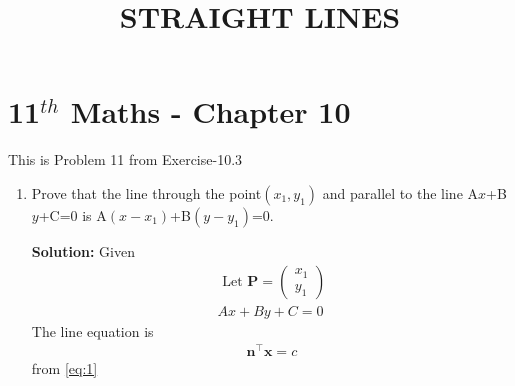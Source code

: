 \documentclass[10pt]{article}
\newcommand{\solution}{\noindent \textbf{Solution: }}
\newcommand{\myvec}[1]{\ensuremath{\begin{pmatrix}#1\end{pmatrix}}}
\let\vec\mathbf{}
\begin{document}
\begin{center}
\title{\textbf{STRAIGHT LINES}}
\date{\vspace{-5ex}} %
\maketitle
\end{center}

\section{11$^{th}$ Maths - Chapter 10}
This is Problem 11 from Exercise-10.3
\begin{enumerate}
\item Prove that the line through the point$(x_1,y_1)$ and parallel to the line A$x$+B$y$+C=0 is A$(x-x_1)$+B$(y-y_1)$=0.

\solution
Given 
\begin{align}
\text{ Let }\vec{P}=\myvec{x_1\\y_1}\\
Ax+By+C=0
\label{eq:1}
\end{align}
The line equation is
\begin{align}
\vec{n}^{\top}\vec{x}=c
\end{align}
from \eqref{eq:1}


\end{enumerate}
\end{document}
